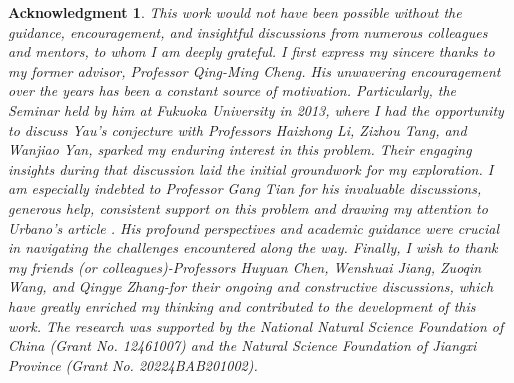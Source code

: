 \documentclass[a4, 12pt]{amsart}
\numberwithin{equation}{section} \numberwithin{equation}{section}
\newtheorem*{ack}{Acknowledgment}
\begin{document}
\begin{ack}
This work would not have been possible without the guidance, encouragement, and insightful discussions from numerous colleagues and mentors, to whom I am deeply grateful. I first express my sincere thanks to my former advisor, Professor Qing-Ming Cheng. His unwavering encouragement over the years has been a constant source of motivation. Particularly, the Seminar held by him at Fukuoka University in 2013, where I had the opportunity to discuss Yau's conjecture with Professors Haizhong Li, Zizhou Tang, and Wanjiao Yan, sparked my enduring interest in this problem. Their engaging insights during that discussion laid the initial groundwork for my exploration.
I am especially indebted to Professor Gang Tian for his invaluable discussions, generous help, consistent support on this problem and drawing my attention to Urbano's article \cite{Urb}. His profound perspectives and academic guidance were crucial in navigating the challenges encountered along the way.
Finally, I wish to thank my friends (or colleagues)-Professors Huyuan Chen, Wenshuai Jiang, Zuoqin Wang, and Qingye Zhang-for their ongoing and constructive discussions, which have greatly enriched my thinking and contributed to the development of this work. The research was supported by the National Natural
Science Foundation of China (Grant No. 12461007) and the Natural Science Foundation of Jiangxi Province (Grant No. 20224BAB201002).
\end{ack}
\end{document}
